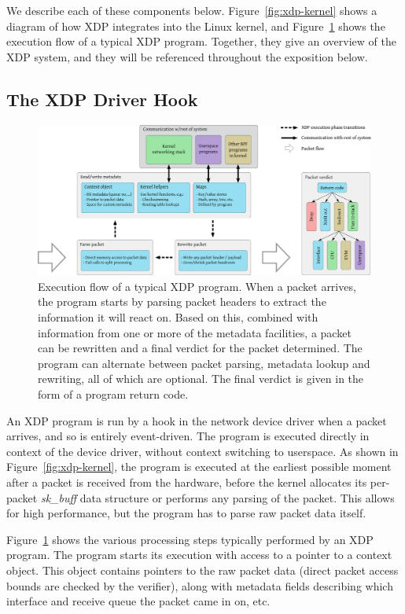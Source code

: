 \documentclass[10pt,sigconf,anonymous]{acmart}
\begin{document}
We describe each of these components below. Figure~\ref{fig:xdp-kernel} shows a
diagram of how XDP integrates into the Linux kernel, and
Figure~\ref{fig:xdp-execution} shows the execution flow of a typical XDP
program. Together, they give an overview of the XDP system, and they will be
referenced throughout the exposition below.

\subsection{The XDP Driver Hook}
\label{sec:prog-model}

\begin{figure}[t]
\centering
\includegraphics[width=\linewidth]{figures/xdp-execution-diagram.pdf}
\caption{\label{fig:xdp-execution} Execution flow of a typical XDP program. When
  a packet arrives, the program starts by parsing packet headers to extract the
  information it will react on. Based on this, combined with information from
  one or more of the metadata facilities, a packet can be rewritten and a final
  verdict for the packet determined. The program can alternate between packet
  parsing, metadata lookup and rewriting, all of which are optional. The final
  verdict is given in the form of a program return code.}
\end{figure}


An XDP program is run by a hook in the network device driver when a packet
arrives, and so is entirely event-driven. The program is executed directly in
context of the device driver, without context switching to userspace. As shown
in Figure~\ref{fig:xdp-kernel}, the program is executed at the earliest possible
moment after a packet is received from the hardware, before the kernel allocates
its per-packet \emph{sk\_buff} data structure or performs any parsing of the
packet. This allows for high performance, but the program has to parse raw
packet data itself.

Figure~\ref{fig:xdp-execution} shows the various processing steps typically
performed by an XDP program. The program starts its execution with access to a
pointer to a context object. This object contains pointers to the raw packet
data (direct packet access bounds are checked by the verifier), along with
metadata fields describing which interface and receive queue the packet came in
on, etc.
\end{document}
